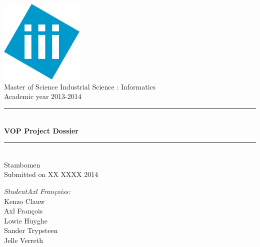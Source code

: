 \documentclass[pdftex,a4paper,12pt,twoside]{report}
\newcommand{\HRule}{\rule{\linewidth}{0.5mm}}
\newcommand{\studenta}{Kenzo Clauw}
\newcommand{\studentb}{Axl Fran\c{c}ois}
\newcommand{\studentc}{Lowie Huyghe}
\newcommand{\studentd}{Sander Trypsteen}
\newcommand{\studente}{Jelle Verreth}
\newcommand{\titel}{VOP Project Dossier}
\newcommand{\ondertitel}{ Stambomen}
\newcommand{\datum}{XX XXXX 2014}
\newcommand{\academiejaar}{2013-2014}
\begin{document}

\begin{titlepage}
\begin{center}
\includegraphics[width=4cm]{images/logo.png}\\[.5cm]
Master of Science Industrial Science : Informatics\\
Academic year \academiejaar

\vfill

\HRule \\[0.4cm]
{ \huge \bfseries \titel}\\[0.4cm]
\HRule \\[0.4cm]

{\Large \ondertitel}\\[0.4cm]

Submitted on \datum

\vfill

\begin{minipage}{0.49\textwidth}
\begin{flushleft}
\emph{Student\ifdefined\studentb s\fi :}\\
\studenta \\
\studentb \\
\studentc \\
\studentd \\
\studente
\par
\end{flushleft}
\end{minipage}
\begin{minipage}{0.49\textwidth}
\begin{flushright}
\end{flushright}
\end{minipage}

\end{center}

\end{titlepage}
\end{document}
